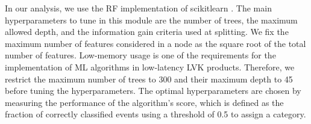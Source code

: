 In our analysis, we use the \ac{RF} implementation of scikitlearn \citep{Pedregosa:2011}. The main hyperparameters  to tune in this module are the number of trees, the maximum allowed depth, and the information gain criteria used at splitting.  We fix the maximum number of features considered in a node  as the square root of the total number of features. Low-memory usage is one of the requirements for the implementation of \ac{ML} algorithms in low-latency \ac{LVK} products. Therefore, we restrict the maximum number of trees to 300 and their maximum depth to 45 before tuning the hyperparameters. The optimal hyperparameters are chosen by measuring the performance of the algorithm's score, which is defined as the fraction of correctly classified events using a threshold of 0.5 to assign a category. %


 



